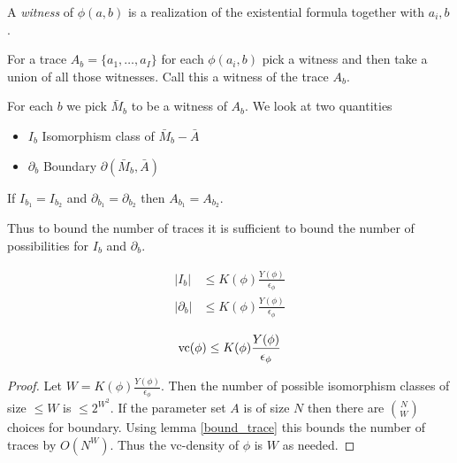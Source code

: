 \documentclass{amsart}
\begin{document}
\begin{Definition}
	A \emph{witness} of $\phi(a, b)$ is a realization of the existential formula together with ${a_i, b}$.
\end{Definition}

\begin{Definition}
	For a trace $A_b = \{a_1, \ldots, a_I\}$ for each $\phi(a_i, b)$ pick a witness and then take a union of all those witnesses. Call this a witness of the trace $A_b$.	%
\end{Definition}

For each $b$ we pick $\bar M_b$ to be a witness of $A_b$. We look at two quantities
\begin{itemize}
	\item $I_b$ Isomorphism class of $\bar M_b - \bar A$
	\item $\partial_b$ Boundary $\partial(\bar M_b, \bar A)$
\end{itemize}

\begin{Lemma} \label {bound_trace}
	If $I_{b_1} = I_{b_2}$ and $\partial_{b_1} = \partial_{b_2}$ then $A_{b_1} = A_{b_2}$.
\end{Lemma}

Thus to bound the number of traces it is sufficient to bound the number of possibilities for $I_b$ and $\partial_b$.

\begin{Theorem} \label{main_bound}
	\begin{align*}
		|I_b| &\leq K(\phi) \frac{Y(\phi)}{\epsilon_\phi}\\
		|\partial_b| &\leq K(\phi) \frac{Y(\phi)}{\epsilon_\phi}
	\end{align*}
\end{Theorem}

\begin{Corollary}
	\begin{align*}
		\operatorname{vc}(\phi) \leq K(\phi) \frac{Y(\phi)}{\epsilon_\phi}
	\end{align*}
\end{Corollary}

\begin{proof}
		Let $W = K(\phi) \frac{Y(\phi)}{\epsilon_\phi}$.
		Then the number of possible isomorphism classes of size $\leq W$ is $\leq 2^{W^2}$.
		If the parameter set $A$ is of size $N$ then there are $N \choose W$ choices for boundary.
		Using lemma \ref{bound_trace} this bounds the number of traces by $O(N^W)$.
		Thus the vc-density of $\phi$ is $W$ as needed.
\end{proof}
\end{document}
